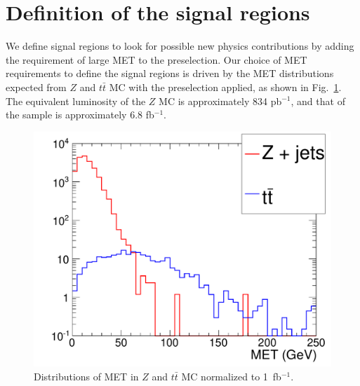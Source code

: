 \section{Definition of the signal regions}
\label{sec:sigregion}

We define signal regions to look for possible
new physics contributions by adding the requirement of large MET to the preselection. 
Our choice of MET requirements to define the signal regions is driven by the 
MET distributions expected from $Z$ and $t\bar{t}$ MC with the preselection applied, 
as shown in Fig.~\ref{fig:metdist}. The equivalent luminosity of the $Z$ MC is 
approximately 834 pb$^{-1}$, and that of the \ttbar sample is approximately 6.8 fb$^{-1}$.

\begin{figure}[tbh]
\begin{center}
\includegraphics[width=0.75\linewidth]{plots/met_ttbar_Z.pdf}
\caption{\label{fig:metdist}\protect Distributions of MET in $Z$ and $t\bar{t}$ MC normalized to 1~fb$^{-1}$.}
\end{center}
\end{figure}

